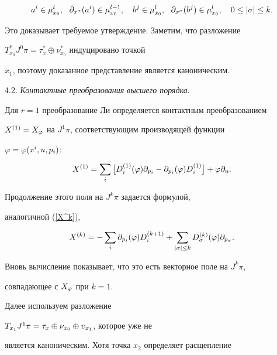 \begin{pf}
$$


a^i\in\mu^l_{x_0},\ \ \p_{x^\z}(a^i)\in\mu^{l-1}_{x_0},\quad


b^j\in\mu^l_{x_0},\ \ \p_{x^\z}(b^j)\in\mu^l_{x_0},\quad


0\le|\z|\le k.


$$


Это доказывает требуемое утверждение. Заметим, что разложение


$T_{x_0}^*J^0\pi=\tau_x^*\oplus\nu_{x_0}^*$ индуцировано точкой


$x_1$, поэтому доказанное представление является каноническим.


\end{pf}








4.2. {\it Контактные преобразования высшего порядка}.


Для $r=1$ преобразование Ли определяется контактным преобразованием


$X^{(1)}=X_\varphi$ на $J^1\pi$, соответствующим производящей функции


$\varphi=\varphi(x^i,u,p_i)$:


$$


X^{(1)}=\sum_i\big[D_i^{(1)}(\vp)\p_{p_i}-\p_{p_i}(\vp)D_i^{(1)}\big]


+\vp\p_u.


$$


Продолжение этого поля на $J^k\pi$ задается формулой,


аналогичной (\ref{X^k}),


\begin{equation}\label{X^kk}


X^{(k)}=-\sum_i \p_{p_i}(\vp)D_i^{(k+1)}+\sum_{|\z|\le


k}D_\z^{(k)}(\vp)\p_{p_\z}.


\end{equation}


Вновь вычисление показывает, что это есть векторное поле на $J^k\pi$,


совпадающее с $X_\varphi$ при $k=1$.





Далее используем разложение


$T_{x_1}J^1\pi=\tau_x\oplus\nu_{x_0}\oplus\upsilon_{x_1}$, которое уже не


является каноническим. Хотя точка $x_2$ определяет расщепление


